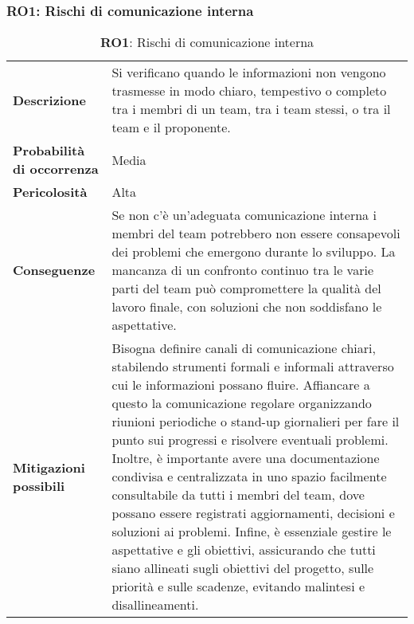\subsubsection{RO1: Rischi di comunicazione interna}
\begin{table}[h!]
    \centering
    \renewcommand{\arraystretch}{1.5} %
    \begin{tabularx}{\textwidth}{|X|X|}\hline
    \rowcolor[HTML]{FFD700} 
    \multicolumn{2}{|c|}{\textbf{Rischi di comunicazione interna}} \\ \hline
    \textbf{Descrizione} &  Si verificano quando le informazioni non vengono trasmesse in modo chiaro, 
    tempestivo o completo tra i membri di un team, tra i team stessi, o tra il team e il proponente.\\ \hline
    \textbf{Probabilità di occorrenza} & Media \\ \hline
    \textbf{Pericolosità} & Alta \\ \hline
    \textbf{Conseguenze} & Se non c'è un'adeguata comunicazione interna i membri del team potrebbero non essere consapevoli dei problemi che emergono durante lo sviluppo. 
    La mancanza di un confronto continuo tra le varie parti del team può compromettere la qualità del lavoro finale, con soluzioni che non soddisfano le aspettative.\\ \hline
    \textbf{Mitigazioni possibili} & Bisogna definire canali di comunicazione chiari, stabilendo strumenti formali e informali attraverso cui le informazioni possano fluire. Affiancare a questo la comunicazione regolare organizzando riunioni periodiche o stand-up giornalieri per fare il punto sui progressi e risolvere eventuali problemi. 
    Inoltre, è importante avere una documentazione condivisa e centralizzata in uno spazio facilmente consultabile da tutti i membri del team, dove possano essere registrati aggiornamenti, decisioni e soluzioni ai problemi. Infine, è essenziale gestire le aspettative e gli obiettivi, assicurando che tutti siano allineati sugli obiettivi del progetto, sulle priorità e sulle scadenze, evitando malintesi e disallineamenti. \\ \hline
    \end{tabularx}
    \caption{\textbf{RO1}: Rischi di comunicazione interna}
    \end{table}

\newpage

